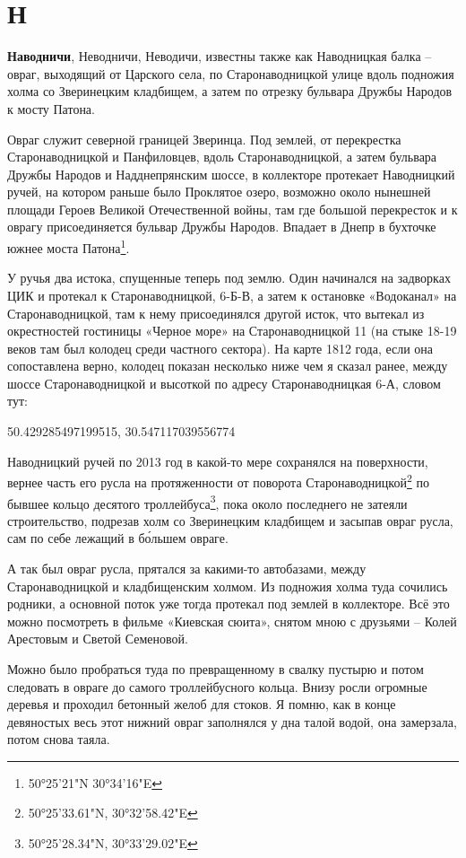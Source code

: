 \chapter*{Н}

\textbf{Наводничи}, Неводничи, Неводичи,  известны также как Наводницкая балка – овраг, выходящий от Царского села, по Старонаводницкой улице вдоль подножия холма со Зверинецким кладбищем, а затем по отрезку бульвара Дружбы Народов к мосту Патона. 

Овраг служит северной границей Зверинца. Под землей, от перекрестка Старонаводницкой и Панфиловцев, вдоль Старонаводницкой, а затем бульвара Дружбы Народов и Надднепрянским шоссе, в коллекторе протекает Наводницкий ручей, на котором раньше было Проклятое озеро, возможно около нынешней площади Героев Великой Отечественной войны, там где большой перекресток и к оврагу присоединяется бульвар Дружбы Народов. Впадает в Днепр в бухточке южнее моста Патона\footnote{50°25'21"N 30°34'16"E}.

У ручья два истока, спущенные теперь под землю. Один начинался на задворках ЦИК и протекал к Старонаводницкой, 6-Б-В, а затем к остановке «Водоканал» на Старонаводницкой, там к нему присоединялся другой исток, что вытекал из окрестностей гостиницы «Черное море» на Старонаводницкой 11 (на стыке 18-19 веков там был колодец среди частного сектора). На карте 1812 года, если она сопоставлена верно, колодец показан несколько ниже чем я сказал ранее, между шоссе Старонаводницкой и высоткой по адресу Старонаводницкая 6-А, словом тут:

50.429285497199515, 30.547117039556774

Наводницкий ручей по 2013 год в какой-то мере сохранялся на поверхности, вернее часть его русла на протяженности от поворота Старонаводницкой\footnote{50°25'33.61"N, 30°32'58.42"E} по бывшее кольцо десятого троллейбуса\footnote{ 50°25'28.34"N, 30°33'29.02"E}, пока около последнего не затеяли строительство, подрезав холм со Зверинецким кладбищем и засыпав овраг русла, сам по себе лежащий в б\'ольшем овраге. 

А так был овраг русла, прятался за какими-то автобазами, между Старонаводницкой и кладбищенским холмом. Из подножия холма туда сочились родники, а основной поток уже тогда протекал под землей в коллекторе. Всё это можно посмотреть в фильме «Киевская сюита», снятом мною с друзьями – Колей Арестовым и Светой Семеновой.

Можно было пробраться туда по превращенному в свалку пустырю и потом следовать в овраге до самого троллейбусного кольца. Внизу росли огромные деревья и проходил бетонный желоб для стоков. Я помню, как в конце девяностых весь этот нижний овраг заполнялся у дна талой водой, она замерзала, потом снова таяла.

